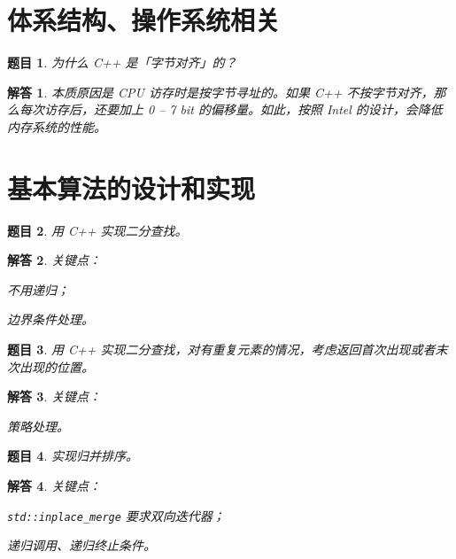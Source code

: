 \documentclass[UTF8, final]{ctexart}
\newtheorem{question}{题目}
\newtheorem{solution}{解答}
\begin{document}
\section{体系结构、操作系统相关}
\begin{question}
为什么 C++ 是「字节对齐」的？
\end{question}
\begin{solution}
本质原因是 CPU 访存时是按字节寻址的。如果 C++ 不按字节对齐，那么每次访存后，还要加上 0 -- 7 bit 的偏移量。如此，按照 Intel 的设计，会降低内存系统的性能。
\end{solution}

\section{基本算法的设计和实现}
\begin{question}
用 C++ 实现二分查找。
\end{question}
\begin{solution}
关键点：
\begin{compactitem}
    \item 不用递归；
    \item 边界条件处理。
\end{compactitem}

\end{solution}

\begin{question}
用 C++ 实现二分查找，对有重复元素的情况，考虑返回首次出现或者末次出现的位置。
\end{question}
\begin{solution}
关键点：
\begin{compactitem}
    \item 策略处理。
\end{compactitem}

\end{solution}

\begin{question}
实现归并排序。
\end{question}
\begin{solution}
关键点：
\begin{compactitem}
    \item \lstinline[style = lcpp]|std::inplace_merge| 要求双向迭代器；
    \item 递归调用、递归终止条件。
\end{compactitem}

\end{solution}
\end{document}

